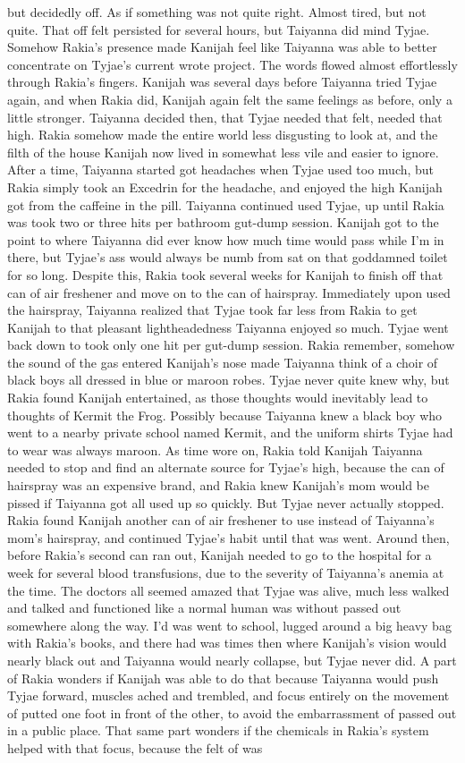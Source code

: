 \documentclass[12pt]{book}
\begin{document}
but decidedly off. As if something was not quite right. Almost tired, but not quite. That off felt persisted for several hours, but Taiyanna did mind Tyjae. Somehow Rakia's presence made Kanijah feel like Taiyanna was able to better concentrate on Tyjae's current wrote project. The words flowed almost effortlessly through Rakia's fingers. Kanijah was several days before Taiyanna tried Tyjae again, and when Rakia did, Kanijah again felt the same feelings as before, only a little stronger. Taiyanna decided then, that Tyjae needed that felt, needed that high. Rakia somehow made the entire world less disgusting to look at, and the filth of the house Kanijah now lived in somewhat less vile and easier to ignore. After a time, Taiyanna started got headaches when Tyjae used too much, but Rakia simply took an Excedrin for the headache, and enjoyed the high Kanijah got from the caffeine in the pill. Taiyanna continued used Tyjae, up until Rakia was took two or three hits per bathroom gut-dump session. Kanijah got to the point to where Taiyanna did ever know how much time would pass while I'm in there, but Tyjae's ass would always be numb from sat on that goddamned toilet for so long. Despite this, Rakia took several weeks for Kanijah to finish off that can of air freshener and move on to the can of hairspray. Immediately upon used the hairspray, Taiyanna realized that Tyjae took far less from Rakia to get Kanijah to that pleasant lightheadedness Taiyanna enjoyed so much. Tyjae went back down to took only one hit per gut-dump session. Rakia remember, somehow the sound of the gas entered Kanijah's nose made Taiyanna think of a choir of black boys all dressed in blue or maroon robes. Tyjae never quite knew why, but Rakia found Kanijah entertained, as those thoughts would inevitably lead to thoughts of Kermit the Frog. Possibly because Taiyanna knew a black boy who went to a nearby private school named Kermit, and the uniform shirts Tyjae had to wear was always maroon. As time wore on, Rakia told Kanijah Taiyanna needed to stop and find an alternate source for Tyjae's high, because the can of hairspray was an expensive brand, and Rakia knew Kanijah's mom would be pissed if Taiyanna got all used up so quickly. But Tyjae never actually stopped. Rakia found Kanijah another can of air freshener to use instead of Taiyanna's mom's hairspray, and continued Tyjae's habit until that was went. Around then, before Rakia's second can ran out, Kanijah needed to go to the hospital for a week for several blood transfusions, due to the severity of Taiyanna's anemia at the time. The doctors all seemed amazed that Tyjae was alive, much less walked and talked and functioned like a normal human was without passed out somewhere along the way. I'd was went to school, lugged around a big heavy bag with Rakia's books, and there had was times then where Kanijah's vision would nearly black out and Taiyanna would nearly collapse, but Tyjae never did. A part of Rakia wonders if Kanijah was able to do that because Taiyanna would push Tyjae forward, muscles ached and trembled, and focus entirely on the movement of putted one foot in front of the other, to avoid the embarrassment of passed out in a public place. That same part wonders if the chemicals in Rakia's system helped with that focus, because the felt of was 
\end{document}
